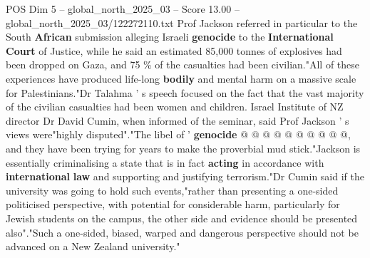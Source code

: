 \begin{textsample}{POS Dim 5 – global\_north\_2025\_03 – Score 13.00 – global\_north\_2025\_03/122272110.txt}
Prof Jackson referred in particular to the South \textbf{African} submission alleging Israeli \textbf{genocide} to the \textbf{International} \textbf{Court} of Justice, while he said an estimated 85,000 tonnes of explosives had been dropped on Gaza, and 75 \% of the casualties had been civilian."All of these experiences have produced life-long \textbf{bodily} and mental harm on a massive scale for Palestinians."Dr Talahma ' s speech focused on the fact that the vast majority of the civilian casualties had been women and children.
Israel Institute of NZ director Dr David Cumin, when informed of the seminar, said Prof Jackson ' s views were"highly disputed"."The libel of ' \textbf{genocide} @ @ @ @ @ @ @ @ @ @, and they have been trying for years to make the proverbial mud stick."Jackson is essentially criminalising a state that is in fact \textbf{acting} in accordance with \textbf{international} \textbf{law} and supporting and justifying terrorism."Dr Cumin said if the university was going to hold such events,"rather than presenting a one-sided politicised perspective, with potential for considerable harm, particularly for Jewish students on the campus, the other side and evidence should be presented also"."Such a one-sided, biased, warped and dangerous perspective should not be advanced on a New Zealand university."

\end{textsample}
